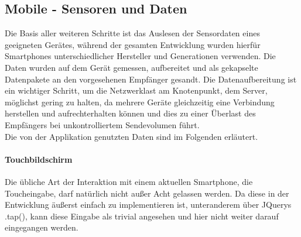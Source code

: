 \documentclass[a4paper]{spie}  %
\begin{document}
\subsection{Mobile - Sensoren und Daten}
Die Basis aller weiteren Schritte ist das Auslesen der Sensordaten eines geeigneten Gerätes, während der gesamten Entwicklung wurden hierfür Smartphones unterschiedlicher Hersteller und Generationen verwenden. Die Daten wurden auf dem Gerät gemessen, aufbereitet und als gekapselte Datenpakete an den vorgesehenen Empfänger gesandt. Die Datenaufbereitung ist ein wichtiger Schritt, um die Netzwerklast am Knotenpunkt, dem Server, möglichst gering zu halten, da mehrere Geräte gleichzeitig eine Verbindung herstellen und aufrechterhalten können und dies zu einer Überlast des Empfängers bei unkontrolliertem Sendevolumen führt.\\
Die von der Applikation genutzten Daten sind im Folgenden erläutert.
\paragraph{Touchbildschirm}
Die übliche Art der Interaktion mit einem aktuellen Smartphone, die Toucheingabe, darf natürlich nicht außer Acht gelassen werden. Da diese in der Entwicklung äußerst einfach zu implementieren ist, unteranderem über JQuerys .tap(), kann diese Eingabe als trivial angesehen und hier nicht weiter darauf eingegangen werden.

\end{document}
